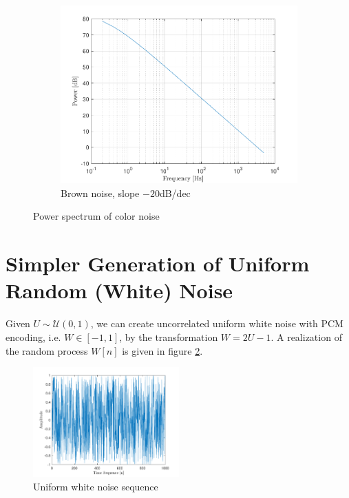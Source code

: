 \documentclass[10pt]{article}
\begin{document}
\begin{figure}[ht]
\begin{subfigure}[b]{0.31\textwidth}
        \includegraphics[width=\textwidth]{problem11_brown_noise_power_spectrum_db.pdf}
        \caption{Brown noise, slope $-20$dB/dec}
    \end{subfigure}
    \caption{Power spectrum of color noise\vspace{-0.5cm}}
    \label{color_noise_freq_domain}
\end{figure}

\section{Simpler Generation of Uniform Random (White) Noise}
Given $U \sim \mathcal{U}(0,1)$, we can create uncorrelated uniform white noise with PCM encoding, i.e. $W \in [-1,1]$, by the transformation $W = 2 U - 1$. A realization of the random process $W[n]$ is given in figure \ref{uniform_white_noise}.

\begin{figure}[ht]
    \centering
    \includegraphics[width=0.5\textwidth]{problem12_uniform_white_noise_sequence.pdf}
    \caption{Uniform white noise sequence\vspace{-0.5cm}}
    \label{uniform_white_noise}
\end{figure}
\end{document}
